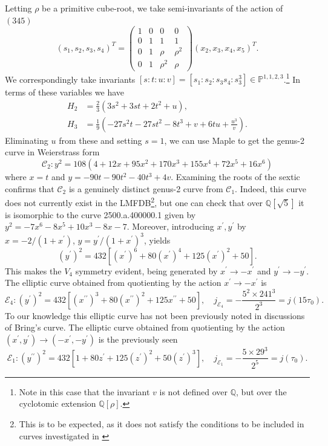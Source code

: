 \documentclass{amsart}
\newcommand{\pround}[1]{\left( #1 \right)}
\newcommand{\psquare}[1]{\left[ #1 \right]}
\begin{document}
Letting $\rho$ be a primitive cube-root, we take semi-invariants of the action of $(345)$
\[
(s_1, s_2, s_3, s_4)^T = \begin{pmatrix}
    1 & 0 & 0 & 0 \\ 0 & 1 & 1 & 1 \\ 0 & 1 & \rho & \rho^2 \\ 0 & 1 & \rho^2 & \rho
    \end{pmatrix} (x_2, x_3, x_4, x_5)^T  . 
\]
We correspondingly take invariants $[s:t:u:v] = [s_1 : s_2 : s_3 s_4 : s_3^3] \in \mathbb{P}^{1,1,2,3}$.\footnote{Note in this case that the invariant $v$ is not defined over $\mathbb{Q}$, but over the cyclotomic extension $\mathbb{Q}[\rho]$.} In terms of these variables we have 
\begin{align*}
    H_2 &= \frac{2}{3} \pround{3s^2 + 3st + 2t^2 + u}  , \\
    H_3 &= \frac{1}{9} \pround{-27s^2t - 27st^2 - 8t^3 + v + 6tu + \frac{u^3}{v}}  .
\end{align*}
Eliminating $u$ from these and setting $s=1$, we can use Maple to get the genus-2 curve in Weierstrass form 
\begin{equation}
\label{qc2} 
\mathcal{C}_2 :  y^2 = 108\pround{4+12x+95x^2+170x^3+155x^4+72x^5+16x^6}
\end{equation}
where $x=t$ and $y=-90t-90t^2-40t^3+4v$. Examining the roots of the sextic confirms that $\mathcal{C}_2$ is a genuinely distinct genus-2 curve from $\mathcal{C}_1$. Indeed, this curve does not currently exist in the LMFDB\footnote{This is to be expected, as it does not satisfy the conditions to be included in curves investigated in \cite{Booker2016}}, but one can check that over $\mathbb{Q}[\sqrt{5}]$ it is isomorphic to the curve 2500.a.400000.1 given by $y^2 = -7x^6 - 8x^5 + 10x^3 - 8x - 7$. Moreover, introducing $x^\prime, y^\prime$ by $x = {-2}/{(1+x^\prime)}$, $y = {y^\prime}/{(1+x^\prime)^3}$, yields
\[
(y^\prime)^2 = 432\psquare{(x^\prime)^6 + 80(x^\prime)^4 + 125(x^\prime)^2 + 50}  . 
\]
This makes the $V_4$ symmetry evident, being generated by $x^\prime \to -x^\prime$ and $y^\prime \to -y^\prime$. The elliptic curve obtained from quotienting by the action $x^\prime \to -x^\prime$ is 
\begin{equation}
\label{qe3} 
\mathcal{E}_4 :  (y^\prime)^2 = 432\psquare{(x^{\prime\prime})^3 + 80(x^{\prime\prime})^2 + 125x^{\prime\prime}+ 50},  \quad j_{\mathcal{E}_4 }=-\frac{5^2\times 241^3}{2^3} = j(15\tau_0)  . 
\end{equation}
To our knowledge this elliptic curve has not been previously noted in discussions of Bring's curve. The elliptic curve obtained from quotienting by the action $(x^\prime, y^\prime) \to (-x^\prime, -y^\prime)$ is the previously seen
\[
\mathcal{E}_1 :  (y^{\prime \prime})^2 = 432\psquare{1 + 80 z^\prime + 125(z^\prime)^2 + 50(z^\prime)^3}  , \quad j_{\mathcal{E}_1} = -\frac{5 \times 29^3}{2^5} = j(\tau_0)  .
\]
\end{document}
